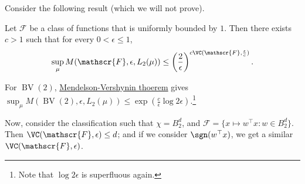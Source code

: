 Consider the following result (which we will not prove).

\begin{theorem}\label{thm:Mendelson-Vershynin}
	Let \(\mathscr{F} \) be a class of functions that is uniformly bounded by \(1\). Then there exists \(c > 1\) such that for every \(0 < \epsilon \leq 1\),
	\[
		\sup _\mu M(\mathscr{F} , \epsilon , L_2(\mu )) \leq \left( \frac{2}{\epsilon } \right) ^{c \VC(\mathscr{F} , \frac{\epsilon}{c})}.
	\]
\end{theorem}

\begin{remark}
	For \(\mathop{\mathrm{BV}}(2) \), \hyperref[thm:Mendelson-Vershynin]{Mendelson-Vershynin thoerem} gives \(\sup _\mu M(\mathop{\mathrm{BV}}(2) , \epsilon , L_2(\mu )) \leq \exp (\frac{c}{\epsilon } \log 2\epsilon )\).\footnote{Note that \(\log 2\epsilon \) is superfluous again.}
\end{remark}

Now, consider the classification such that \(\chi = B_2^d\), and \(\mathscr{F} = \{ x \mapsto w^{\top} x \colon w\in B_2^d \} \). Then \(\VC(\mathscr{F} , \epsilon ) \leq d\); and if we consider \(\sgn (w^{\top} x)\), we get a similar \(\VC(\mathscr{F} , \epsilon )\).